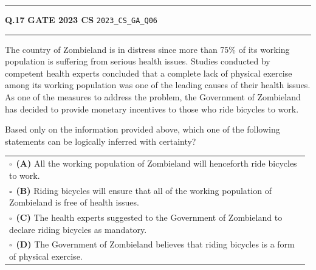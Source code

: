 \documentclass[a4paper,10pt]{article}
\begin{document}
\vspace{6pt}\hrule height 0.35pt\vspace{6pt}
\noindent
\begin{tcolorbox}[
    blanker,
    sidebyside,
    sidebyside align=top,
    lefthand width=0.55\textwidth,
    top=4pt, bottom=4pt, left=0pt, right=0pt,
    middle=16pt,
    underlay={
        \draw[dashed, black!80, line width=0.8pt, dash pattern=on 4pt off 3pt]
            ([xshift=0.55\textwidth+8pt]frame.north west) --
            ([xshift=0.55\textwidth+8pt]frame.south west);
    }
]
\textbf{Q.17}  \hfill {\footnotesize\textbf{GATE 2023 CS} \quad \tiny\texttt{2023\_CS\_GA\_Q06}}
\vspace{2pt}\hrule height 0.3pt\vspace{4pt}

The country of Zombieland is in distress since more than 75\% of its working population is suffering from serious health issues. Studies conducted by competent health experts concluded that a complete lack of physical exercise among its working population was one of the leading causes of their health issues. As one of the measures to address the problem, the Government of Zombieland has decided to provide monetary incentives to those who ride bicycles to work.
\par\medskip
Based only on the information provided above, which one of the following statements can be logically inferred with certainty?

\par\vspace{6pt}\noindent
\begin{tabular}{@{}p{0.98\linewidth}@{}}
$\square$\ \textbf{(A)} All the working population of Zombieland will henceforth ride bicycles to work. \\
\addlinespace[3pt]
$\square$\ \textbf{(B)} Riding bicycles will ensure that all of the working population of Zombieland is free of health issues. \\
\addlinespace[3pt]
$\square$\ \textbf{(C)} The health experts suggested to the Government of Zombieland to declare riding bicycles as mandatory. \\
\addlinespace[3pt]
$\square$\ \textbf{(D)} The Government of Zombieland believes that riding bicycles is a form of physical exercise.
\end{tabular}

\tcblower


\end{tcolorbox}
\end{document}
